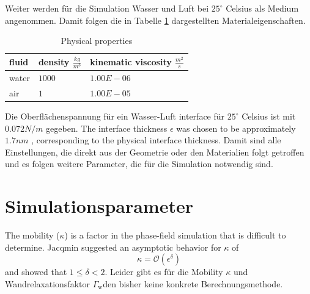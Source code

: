 Weiter werden für die Simulation Wasser und Luft bei $25^{\circ}$ Celsius als Medium angenommen. Damit folgen die in Tabelle \ref{tab:physicalProperties_CaseSetup} dargestellten Materialeigenschaften. 
\begin{table}[h]
    \centering
    \caption{Physical properties}
    \label{tab:physicalProperties_CaseSetup}
    \begin{tabular}{lll}
    fluid & density $\frac{kg}{m^3}$ & kinematic viscosity $\frac{m^2}{s}$ \\ \hline
    water & $1000$                     & $1.00E-06$                          \\
    air   & $1$                        & $1.00E-05$                          \\ 
    \end{tabular}
    \end{table}
Die Oberflächenspannung für ein Wasser-Luft interface für $25^{\circ}$ Celsius ist mit \(0.072 N/m\) gegeben. The interface thickness \( \epsilon \) was chosen to be approximately \(1.7 nm\) \cite{bagheriInterfacialRelaxationCrucial2022}, corresponding to the physical interface thickness. 
Damit sind alle Einstellungen, die direkt aus der Geometrie oder den Materialien folgt getroffen und es folgen weitere Parameter, die für die Simulation notwendig sind.

\section{Simulationsparameter}
The mobility ($\kappa$) is a factor in the phase-field simulation that is difficult to determine. Jacqmin \cite{jacqmin1999CalculationTwoPhaseNavier} suggested an asymptotic behavior for \( \kappa \) of 
\begin{equation}
    \kappa = \mathcal{O}(\epsilon^{\delta})
\end{equation}
and showed that \( 1 \leq \delta < 2 \). Leider gibt es für die Mobility $\kappa$ und Wandrelaxationsfaktor $\Gamma_{\mathrm{w}}$den bisher keine konkrete Berechnungsmethode. 

